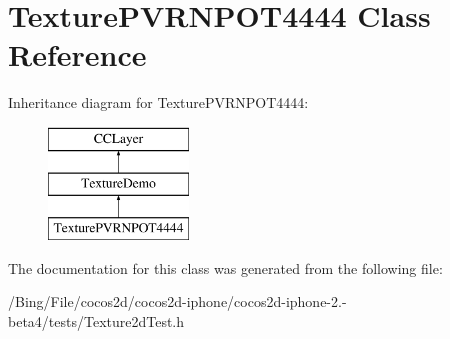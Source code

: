 \hypertarget{interface_texture_p_v_r_n_p_o_t4444}{\section{Texture\-P\-V\-R\-N\-P\-O\-T4444 Class Reference}
\label{interface_texture_p_v_r_n_p_o_t4444}
}
Inheritance diagram for Texture\-P\-V\-R\-N\-P\-O\-T4444\-:\begin{figure}[H]
\begin{center}
\leavevmode
\includegraphics[height=3.000000cm]{interface_texture_p_v_r_n_p_o_t4444}
\end{center}
\end{figure}


The documentation for this class was generated from the following file\-:\begin{DoxyCompactItemize}
\item 
/\-Bing/\-File/cocos2d/cocos2d-\/iphone/cocos2d-\/iphone-\/2.-\/beta4/tests/Texture2d\-Test.\-h\end{DoxyCompactItemize}
